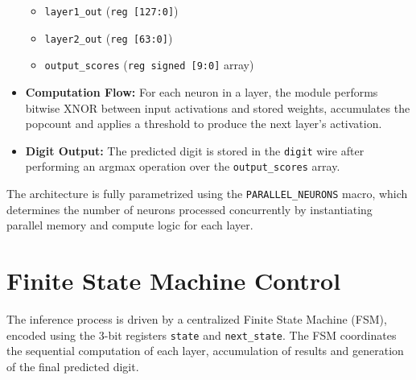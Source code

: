 \documentclass[a4paper,12pt]{report}
\begin{document}
\begin{itemize}
    \begin{itemize}
        \item \texttt{layer1\_out} (\texttt{reg [127:0]})
        \item \texttt{layer2\_out} (\texttt{reg [63:0]})
        \item \texttt{output\_scores} (\texttt{reg signed [9:0]} array)
    \end{itemize}
    \item \textbf{Computation Flow:} For each neuron in a layer, the module performs bitwise XNOR between input activations and stored weights, accumulates the popcount and applies a threshold to produce the next layer's activation.
    \item \textbf{Digit Output:} The predicted digit is stored in the \texttt{digit} wire after performing an argmax operation over the \texttt{output\_scores} array.
\end{itemize}
The architecture is fully parametrized using the \texttt{PARALLEL\_NEURONS} macro, which determines the number of neurons processed concurrently by instantiating parallel memory and compute logic for each layer.


\section{Finite State Machine Control}
The inference process is driven by a centralized Finite State Machine (FSM), encoded using the 3-bit registers \texttt{state} and \texttt{next\_state}. The FSM coordinates the sequential computation of each layer, accumulation of results and generation of the final predicted digit.
\end{document}
